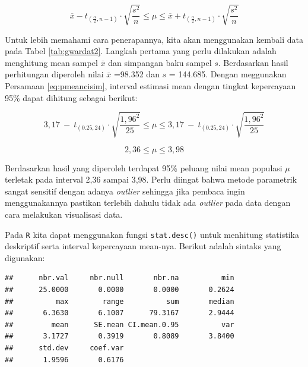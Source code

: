\documentclass[]{book}
\newenvironment{Shaded}{\begin{snugshade}}{\end{snugshade}}
\newcommand{\KeywordTok}[1]{\textcolor[rgb]{0.13,0.29,0.53}{\textbf{#1}}}
\newcommand{\CommentTok}[1]{\textcolor[rgb]{0.56,0.35,0.01}{\textit{#1}}}
\newcommand{\OperatorTok}[1]{\textcolor[rgb]{0.81,0.36,0.00}{\textbf{#1}}}
\newcommand{\NormalTok}[1]{#1}
\begin{document}
\begin{equation}
  \overline{x}-t_{\left(\frac{\alpha}{2},n-1\right)}\cdot\sqrt{\frac{s^2}{n}}\le\mu\le\overline{x}+t_{\left(\frac{\alpha}{2},n-1\right)}\cdot\sqrt{\frac{s^2}{n}}
  \label{eq:pmeancisim}
\end{equation}

Untuk lebih memahami cara penerapannya, kita akan menggunakan kembali
data pada Tabel \ref{tab:gwardat2}. Langkah pertama yang perlu dilakukan
adalah menghitung mean sampel \(\overline{x}\) dan simpangan baku sampel
\(s\). Berdasarkan hasil perhitungan diperoleh nilai \(\overline{x}\)
=98.352 dan \(s\) = 144.685. Dengan meggunakan Persamaan
\eqref{eq:pmeancisim}, interval estimasi mean dengan tingkat kepercayaan
95\% dapat dihitung sebagai berikut:

\[
  3,17\ -\ t_{\left(0.25,24\right)}\cdot\sqrt{\frac{1,96^2}{25}}\le\mu\le3,17\ -\ t_{\left(0.25,24\right)}\cdot\sqrt{\frac{1,96^2}{25}}
\]

\[
  2,36\le\mu\le3,98
\]

Berdasarkan hasil yang diperoleh terdapat 95\% peluang nilai mean
populasi \(\mu\) terletak pada interval 2,36 sampai 3,98. Perlu diingat
bahwa metode parametrik sangat sensitif dengan adanya \emph{outlier}
sehingga jika pembaca ingin menggunakannya pastikan terlebih dahulu
tidak ada \emph{outlier} pada data dengan cara melakukan visualisasi
data.

Pada \texttt{R} kita dapat menggunakan fungsi \texttt{stat.desc()} untuk
menhitung statistika deskriptif serta interval kepercayaan mean-nya.
Berikut adalah sintaks yang digunakan:

\begin{Shaded}
\end{Shaded}

\begin{verbatim}
##      nbr.val     nbr.null       nbr.na          min 
##      25.0000       0.0000       0.0000       0.2624 
##          max        range          sum       median 
##       6.3630       6.1007      79.3167       2.9444 
##         mean      SE.mean CI.mean.0.95          var 
##       3.1727       0.3919       0.8089       3.8400 
##      std.dev     coef.var 
##       1.9596       0.6176
\end{verbatim}
\end{document}
